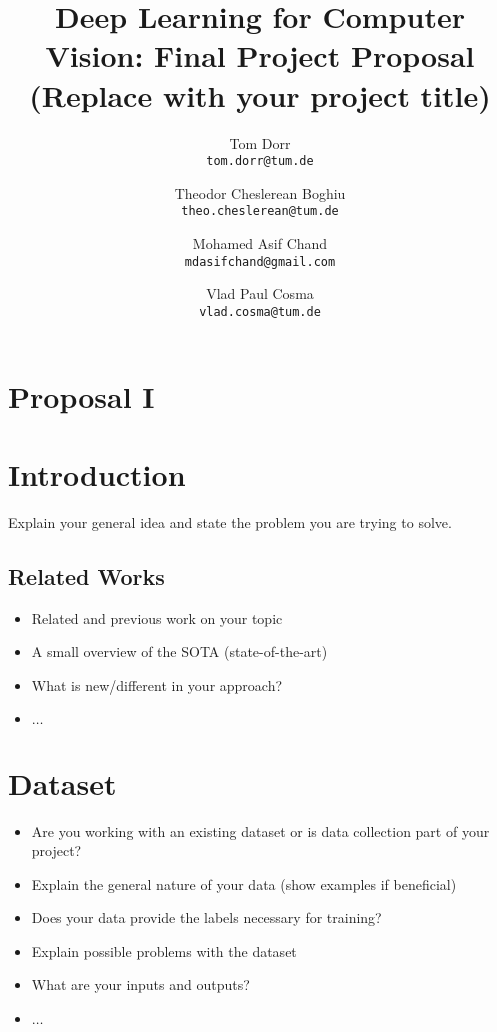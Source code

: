 \documentclass[10pt,twocolumn,letterpaper]{article}
\begin{document}
\title{Deep Learning for Computer Vision: Final Project Proposal\\(Replace with your project title)}

\author{Tom Dorr\\
{\tt\small tom.dorr@tum.de}
\and
Theodor Cheslerean Boghiu\\
{\tt\small theo.cheslerean@tum.de}
\and
Mohamed Asif Chand\\
{\tt\small mdasifchand@gmail.com}
\and
Vlad Paul Cosma\\
{\tt\small vlad.cosma@tum.de}
}

\maketitle

%
%
\section*{Proposal I}
\section{Introduction}
    Explain your general idea and state the problem you are trying to solve.

    \subsection{Related Works}
        \begin{itemize}
            \item Related and previous work on your topic
            \item A small overview of the SOTA (state-of-the-art)
            \item What is new/different in your approach?
            \item[] $\dots$
        \end{itemize}

\section{Dataset}
    \begin{itemize}
        \item Are you working with an existing dataset or is data collection part of your project?
        \item Explain the general nature of your data (show examples if beneficial)
        \item Does your data provide the labels necessary for training?
        \item Explain possible problems with the dataset
        \item What are your inputs and outputs?
        \item[] $\dots$
    \end{itemize}
\end{document}
